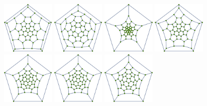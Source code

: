 \documentclass[article,a4paper,twoside]{memoir}
\begin{document}
 \begin{figure}[htbp]
	\centering
  		 \includegraphics[width=0.225\textwidth]{Graph1.png}
		 \includegraphics[width=0.225\textwidth]{Graph2.png}
		 \includegraphics[width=0.225\textwidth]{Graph3.png}
		 \includegraphics[width=0.225\textwidth]{Graph4.png}
		 \includegraphics[width=0.225\textwidth]{Graph5.png}
		 \includegraphics[width=0.225\textwidth]{Graph6.png}
		 \includegraphics[width=0.225\textwidth]{Graph7.png}

\end{figure}
\end{document}
